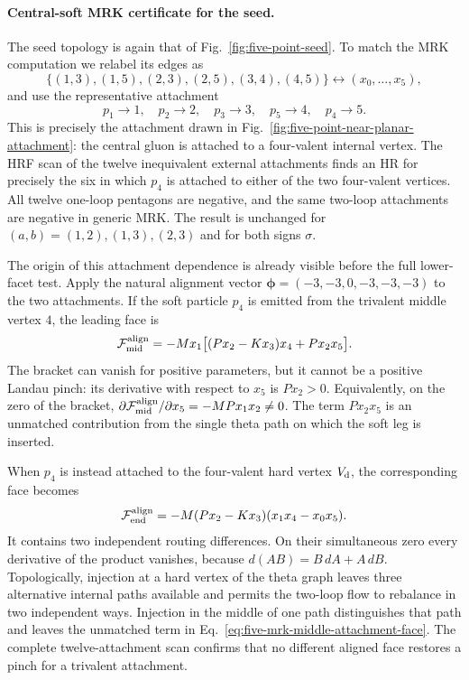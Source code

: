 \documentclass[a4paper,11pt]{article}
\begin{document}
\paragraph{Central-soft MRK certificate for the seed.}

The seed topology is again that of Fig.~\ref{fig:five-point-seed}.  To match
the MRK computation we relabel its edges as
\begin{equation}
 \{(1,3),(1,5),(2,3),(2,5),(3,4),(4,5)\}
 \longleftrightarrow(x_0,\ldots,x_5),
 \label{eq:five-mrk-edges}
\end{equation}
and use the representative attachment
\begin{equation}
 p_1\to1,\quad p_2\to2,\quad p_3\to3,\quad
 p_5\to4,\quad p_4\to5.
 \label{eq:five-mrk-attachments}
\end{equation}
This is precisely the attachment drawn in
Fig.~\ref{fig:five-point-near-planar-attachment}: the central gluon is
attached to a four-valent internal vertex.  The HRF scan of the twelve
inequivalent external attachments finds an HR
for precisely the six in which \(p_4\) is attached to either of the two
four-valent vertices.  All twelve one-loop pentagons are negative, and the
same two-loop attachments are negative in generic MRK.  The result is
unchanged for \((a,b)=(1,2),(1,3),(2,3)\) and for both signs \(\sigma\).

The origin of this attachment dependence is already visible before the
full lower-facet test.  Apply the natural alignment vector
\(\boldsymbol\phi=(-3,-3,0,-3,-3,-3)\) to the two attachments.  If the
soft particle \(p_4\) is emitted from the trivalent middle vertex \(4\), the
leading face is
\begin{equation}
 \mathcal F_{\rm mid}^{\rm align}
 =-Mx_1\big[(Px_2-Kx_3)x_4+Px_2x_5\big].
 \label{eq:five-mrk-middle-attachment-face}
\end{equation}
The bracket can vanish for positive parameters, but it cannot be a positive
Landau pinch: its derivative with respect to \(x_5\) is \(Px_2>0\).
Equivalently, on the zero of the bracket,
\(\partial\mathcal F_{\rm mid}^{\rm align}/\partial x_5=-MPx_1x_2\ne0\).
The term \(Px_2x_5\) is an unmatched contribution from the single theta
path on which the soft leg is inserted.

When \(p_4\) is instead attached to the four-valent hard vertex \(V_{\rm d}\),
the corresponding face becomes
\begin{equation}
 \mathcal F_{\rm end}^{\rm align}
 =-M(Px_2-Kx_3)(x_1x_4-x_0x_5).
 \label{eq:five-mrk-endpoint-attachment-face}
\end{equation}
It contains two independent routing differences.  On their simultaneous
zero every derivative of the product vanishes, because
\(d(AB)=B\,dA+A\,dB\).  Topologically, injection at a hard vertex of the theta graph leaves
three alternative internal paths available and permits the two-loop flow to
rebalance in two independent ways.  Injection in the middle of one path
distinguishes that path and leaves the unmatched term in
Eq.~\eqref{eq:five-mrk-middle-attachment-face}.  The complete twelve-attachment
scan confirms that no different aligned face restores a pinch for a
trivalent attachment.
\end{document}
